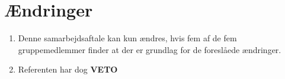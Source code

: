 \section{Ændringer}
\begin{enumerate}
\item{Denne samarbejdsaftale kan kun ændres, hvis fem af de fem gruppemedlemmer finder at der er
grundlag for de foreslåede ændringer.}
\item Referenten har dog \textbf{VETO}
\end{enumerate}
